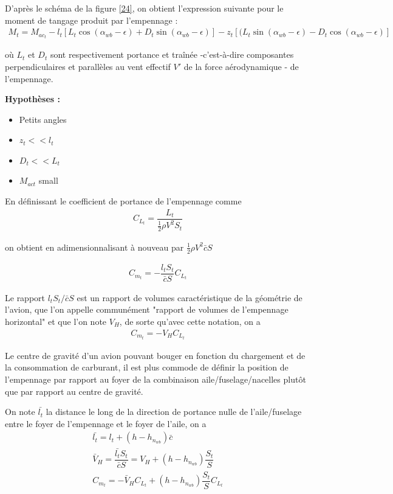 \documentclass{report}
\begin{document}
D'après le schéma de la figure \ref{24}, on obtient l'expression suivante pour le moment de tangage produit par l'empennage :
\begin{eqnarray}
M_t=M_{ac_t}-l_t[L_t\cos(\alpha_{wb}-\epsilon)+D_t\sin(\alpha_{wb}-\epsilon)]-z_t[(L_t\sin(\alpha_{wb}-\epsilon)-D_t\cos(\alpha_{wb}-\epsilon)]
\end{eqnarray}

où $L_t$ et $D_t$ sont respectivement portance et traînée -c'est-à-dire composantes perpendiculaires et parallèles au vent effectif $V'$ de la force aérodynamique - de l'empennage. 

\textbf{Hypothèses :}
\begin{itemize}
    \item Petits angles
    \item $z_t<<l_t$
    \item $D_t<<L_t$
    \item $M_{act}$ small
\end{itemize}

En définissant le coefficient de portance de l'empennage comme
\begin{eqnarray}
C_{L_t}=\dfrac{L_t}{\frac{1}{2}\rho V^2 S_t}
\end{eqnarray}

on obtient en adimensionnalisant à nouveau par $\frac{1}{2}\rho V^2\bar{c}S$

\begin{eqnarray}
C_{m_t} = -\dfrac{l_tS_t}{\bar{c} S}C_{L_t}
\end{eqnarray}

Le rapport $l_tS_t/\bar{c}S$ est un rapport de volumes caractéristique de la géométrie de l'avion, que l'on appelle communément "rapport de volumes de l'empennage horizontal" et que l'on note $V_H$, de sorte qu'avec cette notation, on a
\begin{eqnarray}
C_{m_t}=-V_HC_{L_t}
\end{eqnarray}

Le centre de gravité d’un avion pouvant bouger en fonction du chargement et
de la consommation de carburant, il est plus commode de définir la position
de l’empennage par rapport au foyer de la combinaison aile/fuselage/nacelles
plutôt que par rapport au centre de gravité.

On note $\bar{l_t}$ la distance le long de la direction de portance nulle de l'aile/fuselage entre le foyer de l'empennage et le foyer de l'aile, on a
\begin{eqnarray}
\bar{l_t}=l_t+(h-h_{n_{wb}})\bar{c}\\
\bar{V}_H=\dfrac{\bar{l_t}S_t}{\bar{c}S}=V_H+(h-h_{n_{wb}})\dfrac{S_t}{S}\\
C_{m_t}=-\bar{V}_HC_{L_t}+(h-h_{n_{wb}})\dfrac{S_t}{S}C_{L_t}
\end{eqnarray}
\end{document}
